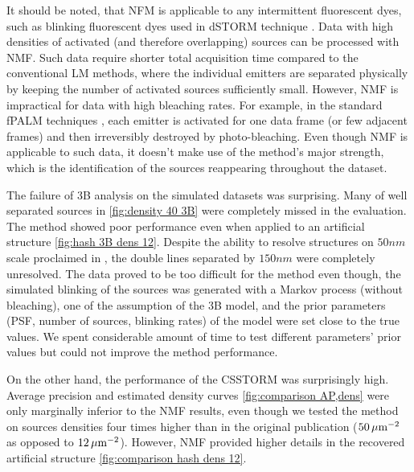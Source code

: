 It should be noted, that NFM is applicable to any intermittent fluorescent dyes, such as blinking fluorescent dyes used in dSTORM technique \cite{VandeLinde2011}. Data with high densities of activated (and therefore overlapping) sources can be processed with NMF. Such data require shorter total acquisition time compared to the conventional LM methods, where the individual emitters are separated physically by keeping the number of activated sources sufficiently small. However, NMF is impractical for data with high bleaching rates. For example, in the standard fPALM techniques \cite{Hess2006}, each emitter is activated for one data frame (or few adjacent frames) and then irreversibly destroyed by photo-bleaching.  Even though NMF is applicable to such data, it doesn't make use of the method's major strength, which is the identification of the sources reappearing throughout the dataset.  
 
The failure of 3B analysis on the simulated datasets was surprising. Many of well separated sources in \autoref{fig:density 40 3B} were completely missed in the evaluation. The method showed poor performance even when applied to an artificial structure \autoref{fig:hash 3B  dens 12}. Despite the ability to resolve structures on $50 \unit{nm}$ scale proclaimed in \cite{Cox2011}, the double lines separated by $150 \unit{nm}$ were completely unresolved. The data proved to be too difficult for the method even though, the simulated blinking of the sources was generated with a Markov process (without bleaching), one of the assumption of the 3B model, and the prior parameters (PSF, number of sources, blinking rates) of the model were set close to the true values. We spent considerable amount of time to test different parameters' prior values but could not improve the method performance. 

On the other hand, the performance of the CSSTORM was surprisingly high. Average precision and estimated density curves \autoref{fig:comparison AP,dens} were only marginally inferior to the NMF results, even though we tested the method on sources densities four times higher than in the original publication \cite{Zhu2012} ($50 \, \mathrm{\mu m}^{-2}$ as opposed to $12 \, \mathrm{\mu m}^{-2}$). However, NMF provided higher details in the recovered artificial structure \autoref{fig:comparison hash dens 12}. 

